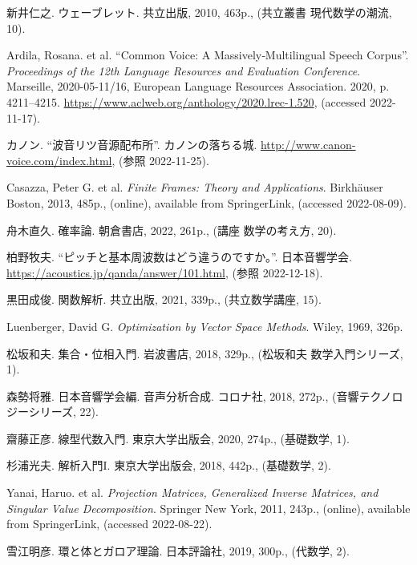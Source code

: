 \documentclass[../../main]{subfiles}
\begin{document}
{}
\begin{thebibliography}{99}
    新井仁之. ウェーブレット. 共立出版, 2010, 463p., (共立叢書 現代数学の潮流, 10).

    Ardila, Rosana. et al. “Common Voice: A Massively‐Multilingual Speech Corpus”. \textit{Proceedings of the 12th Language Resources and Evaluation Conference}. Marseille, 2020-05-11/16, European Language Resources Association. 2020, p. 4211–4215. \url{https://www.aclweb.org/anthology/2020.lrec-1.520}, (accessed 2022-11-17).

    カノン. “波音リツ音源配布所”. カノンの落ちる城. \url{http://www.canon-voice.com/index.html}, (参照 2022-11-25).

    Casazza, Peter G. et al. \textit{Finite Frames: Theory and Applications}. Birkhäuser Boston, 2013, 485p., (online), available from SpringerLink, (accessed 2022-08-09).

    舟木直久. 確率論. 朝倉書店, 2022, 261p., (講座 数学の考え方, 20).

    柏野牧夫. “ピッチと基本周波数はどう違うのですか。”. 日本音響学会. \url{https://acoustics.jp/qanda/answer/101.html}, (参照 2022-12-18).

    黒田成俊. 関数解析. 共立出版, 2021, 339p., (共立数学講座, 15).

    Luenberger, David G. \textit{Optimization by Vector Space Methods}. Wiley, 1969, 326p.

    松坂和夫. 集合・位相入門. 岩波書店, 2018, 329p., (松坂和夫 数学入門シリーズ, 1).

    森勢将雅. 日本音響学会編. 音声分析合成. コロナ社, 2018, 272p., (音響テクノロジーシリーズ, 22).

    齋藤正彦. 線型代数入門. 東京大学出版会, 2020, 274p., (基礎数学, 1).

    杉浦光夫. 解析入門I. 東京大学出版会, 2018, 442p., (基礎数学, 2).

    Yanai, Haruo. et al. \textit{Projection Matrices, Generalized Inverse Matrices, and Singular Value Decomposition}. Springer New York, 2011, 243p., (online), available from SpringerLink, (accessed 2022-08-22).

    雪江明彦. 環と体とガロア理論. 日本評論社, 2019, 300p., (代数学, 2).
\end{thebibliography}
\end{document}
